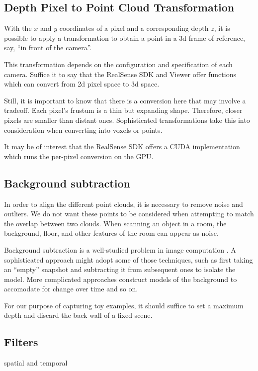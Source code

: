 \subsection{Depth Pixel to Point Cloud Transformation}
With the $x$ and $y$ coordinates of a pixel and a corresponding depth $z$,
it is possible to apply a transformation to obtain a point in a 3d frame of
reference, say, ``in front of the camera''.

This transformation depends on the configuration and specification of each camera.
Suffice it to say that the RealSense SDK and Viewer offer functions which can
convert from 2d pixel space to 3d space.

Still, it is important to know that there is a conversion here
 that may involve a tradeoff. Each pixel's frustum is a thin but expanding shape.
Therefore, closer pixels are smaller than distant ones. Sophisticated
transformations take this into consideration when converting into voxels
or points.

It may be of interest that the RealSense SDK offers a CUDA implementation
which runs the per-pixel conversion on the GPU.

\subsection{Background subtraction}

In order to align the different point clouds, it is necessary to remove noise and
outliers. We do not want these points to be considered when attempting to match
the overlap between two clouds.
When scanning an object in a room, the background, floor, and other features
of the room can appear as noise.

Background subtraction is a well-studied problem in image computation \cite{piccardi2004background}.
A sophisticated approach might adopt some of those techniques, such as
first taking an ``empty'' snapshot and subtracting it from subsequent ones to
isolate the model. More complicated approaches construct models of the background
to accomodate for change over time and so on.

For our purpose of capturing toy examples, it should suffice to set a maximum depth
and discard the back wall of a fixed scene.

\subsection{Filters}

spatial and temporal

